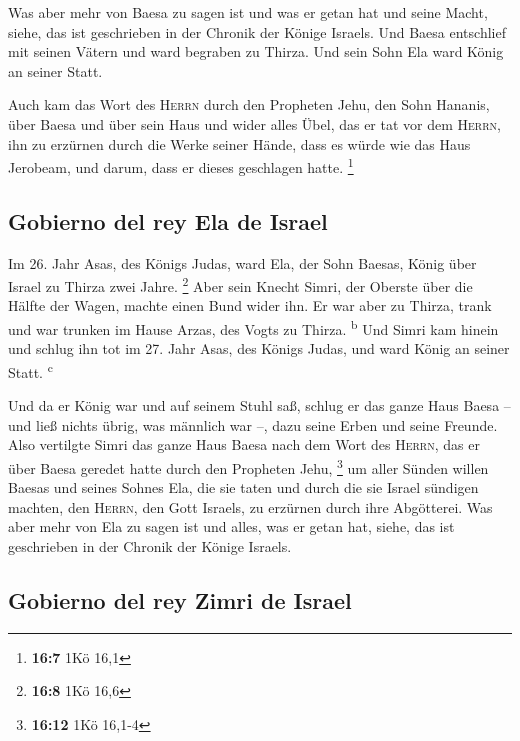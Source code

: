  Was aber mehr von Baesa zu sagen ist und was er getan hat
und seine Macht, siehe, das ist geschrieben in der Chronik der Könige
Israels.  Und Baesa entschlief mit seinen Vätern und ward
begraben zu Thirza. Und sein Sohn Ela ward König an seiner Statt.

 Auch kam das Wort des \textsc{Herrn} durch den Propheten
Jehu, den Sohn Hananis, über Baesa und über sein Haus und wider alles
Übel, das er tat vor dem \textsc{Herrn}, ihn zu erzürnen durch die Werke
seiner Hände, dass es würde wie das Haus Jerobeam, und darum, dass er
dieses geschlagen hatte. \footnote{\textbf{16:7} 1Kö 16,1}

\hypertarget{gobierno-del-rey-ela-de-israel}{%
\subsection{Gobierno del rey Ela de
Israel}\label{gobierno-del-rey-ela-de-israel}}

 Im 26. Jahr Asas, des Königs Judas, ward Ela, der Sohn
Baesas, König über Israel zu Thirza zwei Jahre. \footnote{\textbf{16:8}
  1Kö 16,6}  Aber sein Knecht Simri, der Oberste über die
Hälfte der Wagen, machte einen Bund wider ihn. Er war aber zu Thirza,
trank und war trunken im Hause Arzas, des Vogts zu Thirza.
\textsuperscript{b}  Und Simri kam hinein und schlug ihn
tot im 27. Jahr Asas, des Königs Judas, und ward König an seiner Statt.
\textsuperscript{c}

 Und da er König war und auf seinem Stuhl saß, schlug er
das ganze Haus Baesa -- und ließ nichts übrig, was männlich war --, dazu
seine Erben und seine Freunde.  Also vertilgte Simri das
ganze Haus Baesa nach dem Wort des \textsc{Herrn}, das er über Baesa
geredet hatte durch den Propheten Jehu, \footnote{\textbf{16:12} 1Kö
  16,1-4}  um aller Sünden willen Baesas und seines
Sohnes Ela, die sie taten und durch die sie Israel sündigen machten, den
\textsc{Herrn}, den Gott Israels, zu erzürnen durch ihre Abgötterei.
 Was aber mehr von Ela zu sagen ist und alles, was er
getan hat, siehe, das ist geschrieben in der Chronik der Könige Israels.

\hypertarget{gobierno-del-rey-zimri-de-israel}{%
\subsection{Gobierno del rey Zimri de
Israel}\label{gobierno-del-rey-zimri-de-israel}}

